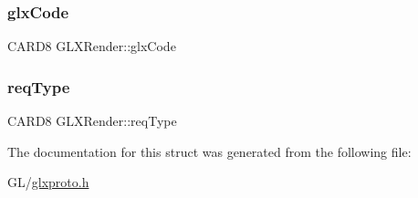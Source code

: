 \mbox{\label{struct_g_l_x_render_a3152a1c534f08e16a916f396ccf3e4ab}} 
\subsubsection{\texorpdfstring{glx\+Code}{glxCode}}
{\footnotesize\ttfamily C\+A\+R\+D8 G\+L\+X\+Render\+::glx\+Code}

\mbox{\label{struct_g_l_x_render_a815efd4037cdcaa5d01b627744901bf5}} 
\subsubsection{\texorpdfstring{req\+Type}{reqType}}
{\footnotesize\ttfamily C\+A\+R\+D8 G\+L\+X\+Render\+::req\+Type}



The documentation for this struct was generated from the following file\+:\begin{DoxyCompactItemize}
\item 
G\+L/\hyperlink{glxproto_8h}{glxproto.\+h}\end{DoxyCompactItemize}
